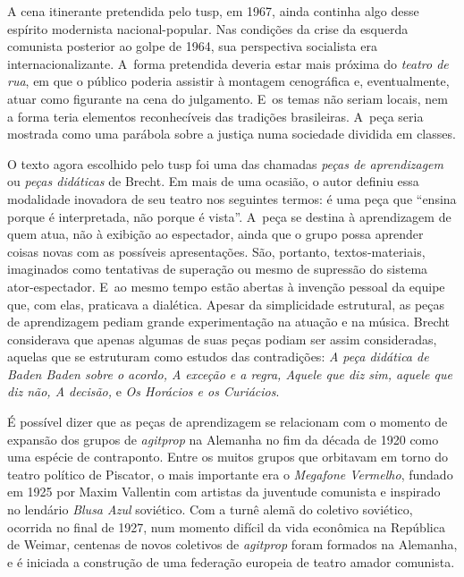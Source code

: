 
A cena itinerante pretendida pelo {\sc tusp}, em 1967, ainda continha algo
desse espírito modernista nacional-popular. Nas condições da crise da
esquerda comunista posterior ao golpe de 1964, sua perspectiva
socialista era internacionalizante. A~forma pretendida deveria estar
mais próxima do {\it teatro de rua}, em que o público poderia assistir à
montagem cenográfica e, eventualmente, atuar como figurante na cena do
julgamento. E~os temas não seriam locais, nem a forma teria elementos
reconhecíveis das tradições brasileiras. A~peça seria mostrada como uma
parábola sobre a justiça numa sociedade dividida em classes.

\subject{Estudo de formas cênico-dramatúrgicas: aprendizagem e agitprop}

O texto agora escolhido pelo {\sc tusp} foi uma das chamadas {\it peças de
aprendizagem} ou {\it peças didáticas} de Brecht. Em mais de uma
ocasião, o autor definiu essa modalidade inovadora de seu teatro nos
seguintes termos: é uma peça que “ensina porque é interpretada, não
porque é vista”. A~peça se destina à aprendizagem de quem atua, não à
exibição ao espectador, ainda que o grupo possa aprender coisas novas
com as possíveis apresentações. São, portanto, textos-materiais,
imaginados como tentativas de superação ou mesmo de supressão do sistema
ator-espectador. E~ao mesmo tempo estão abertas à invenção pessoal da
equipe que, com elas, praticava a dialética. Apesar da
simplicidade estrutural, as peças de aprendizagem pediam grande
experimentação na atuação e na música. Brecht considerava que apenas
algumas de suas peças podiam ser assim consideradas, aquelas que se
estruturam como estudos das contradições: {\it A peça didática de Baden
Baden sobre o acordo, A exceção e a regra, Aquele que diz sim, aquele
que diz não, A decisão,} e {\it Os Horácios e os Curiácios}.

É possível dizer que as peças de aprendizagem se relacionam com o
momento de expansão dos grupos de {\it agitprop} na Alemanha no fim da
década de 1920 como uma espécie de contraponto. Entre os muitos grupos
que orbitavam em torno do teatro político de Piscator, o
mais importante era o {\it Megafone Vermelho}, fundado em 1925 por
Maxim Vallentin com artistas da juventude comunista e inspirado no
lendário {\it Blusa Azul} soviético. Com a turnê alemã do coletivo
soviético, ocorrida no final de 1927, num momento difícil da vida
econômica na República de Weimar, centenas de novos coletivos de
{\it agitprop} foram formados na Alemanha, e é iniciada a construção de
uma federação europeia de teatro amador comunista.

